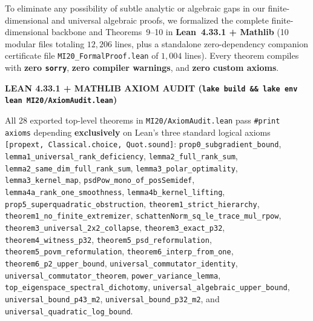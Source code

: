\documentclass[10pt,letterpaper]{article}
\begin{document}
To eliminate any possibility of subtle analytic or algebraic gaps in our finite-dimensional and universal algebraic proofs, we formalized the complete finite-dimensional backbone and Theorems~9--10 in \textbf{Lean~4.33.1 + Mathlib} (10 modular files totaling $12{,}206$ lines, plus a standalone zero-dependency companion certificate file \texttt{MI20\_FormalProof.lean} of $1{,}004$ lines). Every theorem compiles with \textbf{zero \texttt{sorry}}, \textbf{zero compiler warnings}, and \textbf{zero custom axioms}.

\begin{tcolorbox}[leanbox]
{\sffamily\footnotesize\bfseries\color{leanborder}LEAN 4.33.1 + MATHLIB AXIOM AUDIT (\texttt{lake build \&\& lake env lean MI20/AxiomAudit.lean})}\par\vspace{2.5pt}
{\raggedright\small All 28 exported top-level theorems in \texttt{MI20/AxiomAudit.lean} pass \texttt{\#print axioms} depending \textbf{exclusively} on Lean's three standard logical axioms \texttt{[propext, Classical.choice, Quot.sound]}: \texttt{prop0\_subgradient\_bound}, \texttt{lemma1\_universal\_rank\_deficiency}, \texttt{lemma2\_full\_rank\_sum}, \texttt{lemma2\_same\_dim\_full\_rank\_sum}, \texttt{lemma3\_polar\_optimality}, \texttt{lemma3\_kernel\_map}, \texttt{psdPow\_mono\_of\_posSemidef}, \texttt{lemma4a\_rank\_one\_smoothness}, \texttt{lemma4b\_kernel\_lifting}, \texttt{prop5\_superquadratic\_obstruction}, \texttt{theorem1\_strict\_hierarchy}, \texttt{theorem1\_no\_finite\_extremizer}, \texttt{schattenNorm\_sq\_le\_trace\_mul\_rpow}, \texttt{theorem3\_universal\_2x2\_collapse}, \texttt{theorem3\_exact\_p32}, \texttt{theorem4\_witness\_p32}, \texttt{theorem5\_psd\_reformulation}, \texttt{theorem5\_povm\_reformulation}, \texttt{theorem6\_interp\_from\_one}, \texttt{theorem6\_p2\_upper\_bound}, \texttt{universal\_commutator\_identity}, \texttt{universal\_commutator\_theorem}, \texttt{power\_variance\_lemma}, \texttt{top\_eigenspace\_spectral\_dichotomy}, \texttt{universal\_algebraic\_upper\_bound}, \texttt{universal\_bound\_p43\_m2}, \texttt{universal\_bound\_p32\_m2}, and \texttt{universal\_quadratic\_log\_bound}.\par}
\end{tcolorbox}
\end{document}
